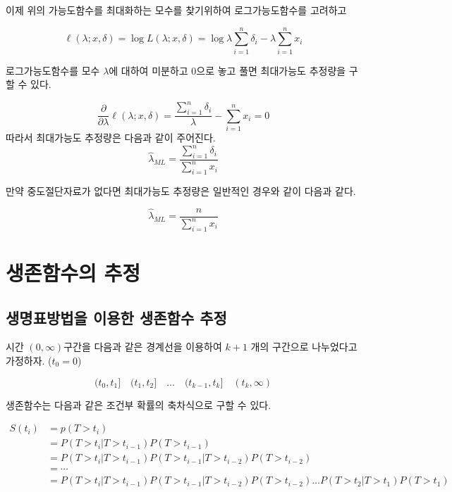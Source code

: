 \documentclass[
]{book}
\theoremstyle{definition}
\theoremstyle{definition}
\theoremstyle{definition}
\theoremstyle{definition}
\theoremstyle{remark}
\begin{document}
이제 위의 가능도함수를 최대화하는 모수를 찾기위하여 로그가능도함수를 고려하고

\[ \ell (\lambda; x, \delta) = \log L(\lambda; x, \delta) = 
    \log \lambda \sum_{i=1}^n \delta_i - \lambda \sum_{i=1}^n x_i \]

로그가능도함수를 모수 \(\lambda\)에 대하여 미분하고 0으로 놓고 풀면 최대가능도 추정량을 구할 수 있다.

\[ \frac{\partial}{\partial \lambda} \ell (\lambda; x, \delta) = 
     \frac{\sum_{i=1}^n \delta_i}{\lambda} - \sum_{i=1}^n x_i = 0 \]
따라서 최대가능도 추정량은 다음과 같이 주어진다.
\[ \hat \lambda_{ML} = \frac{\sum_{i=1}^n \delta_i}{\sum_{i=1}^n x_i} \]

만약 중도절단자료가 없다면 최대가능도 추정량은 일반적인 경우와 같이 다음과 같다.

\[ \hat \lambda_{ML} = \frac{n}{\sum_{i=1}^n x_i} \]

\hypertarget{estsurvival}{%
\chapter{생존함수의 추정}\label{estsurvival}}

\hypertarget{uxc0dduxba85uxd45cuxbc29uxbc95uxc744-uxc774uxc6a9uxd55c-uxc0dduxc874uxd568uxc218-uxcd94uxc815}{%
\section{생명표방법을 이용한 생존함수 추정}\label{uxc0dduxba85uxd45cuxbc29uxbc95uxc744-uxc774uxc6a9uxd55c-uxc0dduxc874uxd568uxc218-uxcd94uxc815}}

시간 \((0, \infty)\)구간을 다음과 같은 경계선을 이용하여 \(k+1\) 개의 구간으로 나누었다고 가정하자. (\(t_0=0\))

\[ (t_0, t_1] \quad (t_1,t_2] \quad \dots \quad (t_{k-1}, t_k] \quad (t_k, \infty) \]

생존함수는 다음과 같은 조건부 확률의 축차식으로 구할 수 있다.

\begin{align*}
S(t_i) & = p(T>t_i) \\
    & = P(T > t_i | T > t_{i-1}) P(T > t_{i-1}) \\
    & = P(T > t_i | T > t_{i-1}) P(T > t_{i-1} | T > t_{i-2}) P(T > t_{i-2} )  \\
    & = \cdots \\
    & = P(T > t_i | T > t_{i-1}) P(T > t_{i-1} | T > t_{i-2}) P(T > t_{i-2} )  \dots  P(T> t_2 | T > t_1)P(T > t_1)
\end{align*}
\end{document}
